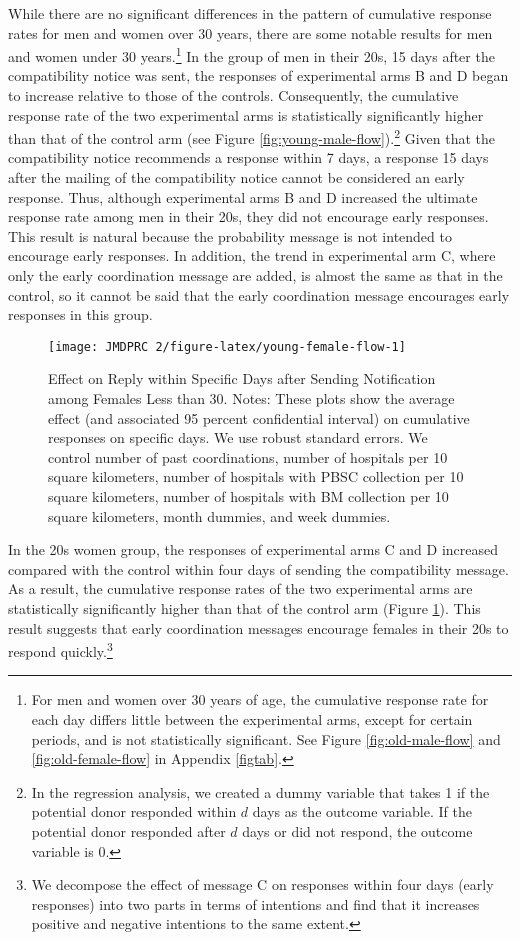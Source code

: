\documentclass[12pt, a4paper]{article}
\begin{document}
While there are no significant differences in the pattern of cumulative response rates for men and women over 30 years, there are some notable results for men and women under 30 years.\footnote{For men and women over 30 years of age, the cumulative response rate for each day differs little between the experimental arms, except for certain periods, and is not statistically significant. See Figure \ref{fig:old-male-flow} and \ref{fig:old-female-flow} in Appendix \ref{figtab}.} In the group of men in their 20s, 15 days after the compatibility notice was sent, the responses of experimental arms B and D began to increase relative to those of the controls. Consequently, the cumulative response rate of the two experimental arms is statistically significantly higher than that of the control arm (see Figure \ref{fig:young-male-flow}).\footnote{In the regression analysis, we created a dummy variable that takes 1 if the potential donor responded within \(d\) days as the outcome variable. If the potential donor responded after \(d\) days or did not respond, the outcome variable is 0.} Given that the compatibility notice recommends a response within 7 days, a response 15 days after the mailing of the compatibility notice cannot be considered an early response. Thus, although experimental arms B and D increased the ultimate response rate among men in their 20s, they did not encourage early responses. This result is natural because the probability message is not intended to encourage early responses. In addition, the trend in experimental arm C, where only the early coordination message are added, is almost the same as that in the control, so it cannot be said that the early coordination message encourages early responses in this group.

\begin{figure}[t]
\texttt{[image: JMDPRC~2/figure-latex/young-female-flow-1]} \caption{Effect on Reply within Specific Days after Sending Notification among Females Less than 30. Notes: These plots show the average effect (and associated 95 percent confidential interval) on cumulative responses on specific days. We use robust standard errors. We control number of past coordinations, number of hospitals per 10 square kilometers, number of hospitals with PBSC collection per 10 square kilometers, number of hospitals with BM collection per 10 square kilometers, month dummies, and week dummies.}\label{fig:young-female-flow}
\end{figure}

In the 20s women group, the responses of experimental arms C and D increased compared with the control within four days of sending the compatibility message. As a result, the cumulative response rates of the two experimental arms are statistically significantly higher than that of the control arm (Figure \ref{fig:young-female-flow}). This result suggests that early coordination messages encourage females in their 20s to respond quickly.\footnote{We decompose the effect of message C on responses within four days (early responses) into two parts in terms of intentions and find that it increases positive and negative intentions to the same extent.}
\end{document}
